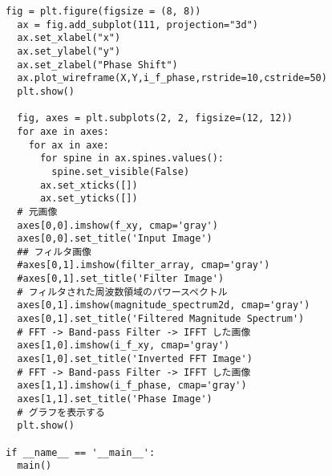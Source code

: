 \begin{lstlisting}[caption=$z$軸回転関連のソースコード,label=src_zrot]
  fig = plt.figure(figsize = (8, 8))
  ax = fig.add_subplot(111, projection="3d")
  ax.set_xlabel("x")
  ax.set_ylabel("y")
  ax.set_zlabel("Phase Shift")
  ax.plot_wireframe(X,Y,i_f_phase,rstride=10,cstride=50)
  plt.show()

  fig, axes = plt.subplots(2, 2, figsize=(12, 12))
  for axe in axes:
    for ax in axe:
      for spine in ax.spines.values():
        spine.set_visible(False)
      ax.set_xticks([])
      ax.set_yticks([])
  # 元画像
  axes[0,0].imshow(f_xy, cmap='gray')
  axes[0,0].set_title('Input Image')
  ## フィルタ画像
  #axes[0,1].imshow(filter_array, cmap='gray')
  #axes[0,1].set_title('Filter Image')
  # フィルタされた周波数領域のパワースペクトル
  axes[0,1].imshow(magnitude_spectrum2d, cmap='gray')
  axes[0,1].set_title('Filtered Magnitude Spectrum')
  # FFT -> Band-pass Filter -> IFFT した画像
  axes[1,0].imshow(i_f_xy, cmap='gray')
  axes[1,0].set_title('Inverted FFT Image')
  # FFT -> Band-pass Filter -> IFFT した画像
  axes[1,1].imshow(i_f_phase, cmap='gray')
  axes[1,1].set_title('Phase Image')
  # グラフを表示する
  plt.show()

if __name__ == '__main__':
  main()
\end{lstlisting}